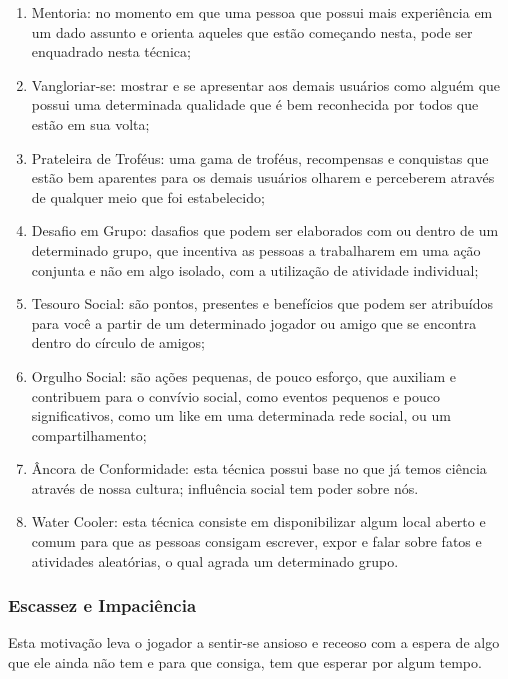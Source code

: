 \begin{enumerate}
    \item Mentoria: no momento em que uma pessoa que possui mais experiência
        em um dado assunto e orienta aqueles que estão começando nesta, pode
        ser enquadrado nesta técnica;
    \item Vangloriar-se: mostrar e se apresentar aos demais usuários como
        alguém que possui uma determinada qualidade que é bem reconhecida
        por todos que estão em sua volta;
    \item Prateleira de Troféus: uma gama de troféus, recompensas e conquistas
        que estão bem aparentes para os demais usuários olharem e perceberem
        através de qualquer meio que foi estabelecido;
    \item Desafio em Grupo: dasafios que podem ser elaborados com ou dentro
        de um determinado grupo, que incentiva as pessoas a trabalharem
        em uma ação conjunta e não em algo isolado, com a utilização de atividade
        individual;
    \item Tesouro Social: são pontos, presentes e benefícios que podem ser atribuídos
        para você a partir de um determinado jogador ou amigo que se encontra dentro
        do círculo de amigos;
    \item Orgulho Social:  são ações pequenas, de pouco esforço, que auxiliam e contribuem
        para o convívio social, como eventos pequenos e pouco significativos,
        como um like em uma determinada rede social, ou um compartilhamento;
    \item Âncora de Conformidade: esta técnica possui base no que já temos ciência
        através de nossa cultura;
        influência social tem poder sobre nós.
    \item Water Cooler: esta técnica consiste em disponibilizar algum local
        aberto e comum para que as pessoas consigam escrever, expor e falar
        sobre fatos e atividades aleatórias, o qual agrada um determinado grupo.

\end{enumerate}

\subsubsection{Escassez e Impaciência}
\label{sub:escassexeimpaciencia}
Esta motivação leva o jogador a sentir-se ansioso e receoso com a espera de algo
que ele ainda não tem e para que consiga, tem que esperar por algum tempo.

